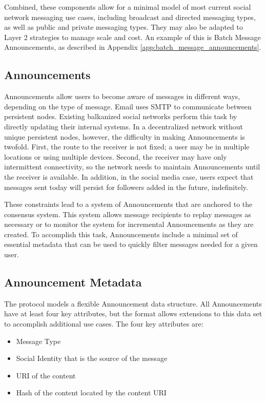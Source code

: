 \documentclass[12pt,letterpaper]{article}
\providecommand{\tightlist}{%
\setlength{\itemsep}{0pt}\setlength{\parskip}{0pt}}
\begin{document}
Combined, these components allow for a minimal model of most current social network
messaging use cases, including broadcast and directed messaging types, as well as public and
private messaging types. They may also be adapted to Layer 2 strategies to manage scale and
cost. An example of this is Batch Message Announcements, as described in Appendix
\ref{app:batch_message_announcements}.

\subsection{Announcements}\label{sec:announcements}

Announcements allow users to become aware of messages in different ways, depending on the
type of message. Email uses SMTP to communicate between persistent nodes. Existing
balkanized social networks perform this task by directly updating their internal systems.
In a decentralized network without unique persistent nodes, however, the difficulty in
making Announcements is twofold. First, the route to the receiver is not fixed; a user may
be in multiple locations or using multiple devices. Second, the receiver may have only
intermittent connectivity, so the network needs to maintain Announcements until the receiver
is available. In addition, in the social media case, users expect that messages sent today
will persist for followers added in the future, indefinitely.

These constraints lead to a system of Announcements that are anchored to the consensus
system.  This system allows message recipients to replay messages as necessary or to monitor
the system for incremental Announcements as they are created. To accomplish this task,
Announcements include a minimal set of essential metadata that can be used to quickly filter
messages needed for a given user.

\subsection{Announcement Metadata}\label{sec:announcement_metadata}

The protocol models a flexible Announcement data structure. All Announcements have at least
four key attributes, but the format allows extensions to this data set to accomplish
additional use cases. The four key attributes are:

\begin{samepage}
	\begin{itemize}
		\tightlist
		\item
		      Message Type
		\item
		      Social Identity that is the source of the message
		\item
		      URI of the content
		\item
		      Hash of the content located by the content URI
	\end{itemize}
\end{samepage}
\end{document}
